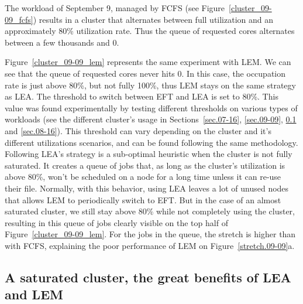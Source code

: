 \documentclass[conference,10pt]{IEEEtran}
\begin{document}
The workload of September 9, managed by FCFS (see Figure~\ref{cluster_09-09_fcfs})
results in a cluster that alternates between full utilization and an approximately 80\% utilization rate.
Thus the queue of requested cores alternates between a few thousands and 0.

Figure~\ref{cluster_09-09_lem} represents the same experiment with LEM.
We can see that the queue of requested cores never hits 0.
In this case, the occupation rate is just above 80\%, but not fully
100\%, thus LEM stays on the same strategy as LEA.
The threshold to switch between EFT and LEA is set to 80\%. 
This value was found experimentally by testing different thresholds on various types of workloads (see the different cluster's usage in Sections~\ref{sec.07-16}, \ref{sec.09-09}, \ref{sec.03-26} and \ref{sec.08-16}).
This threshold can vary depending on the cluster and it's different utilizations scenarios, and can be found following the same methodology.
Following LEA's strategy is a sub-optimal heuristic when the cluster is not fully saturated.
It creates a queue of jobs that, as long as the cluster's utilization is above 80\%, won't
be scheduled on a node for a long time unless it can re-use their file.
Normally, with this behavior, using LEA leaves a lot of unused nodes that allows LEM
to periodically switch to EFT. But in the case of an almost 
saturated cluster, we still stay above 80\% while not completely using the cluster,
resulting in this queue of jobs clearly visible on the top half of Figure~\ref{cluster_09-09_lem}.
For the jobs in the queue, the stretch is higher than with FCFS, explaining the poor performance of
LEM on Figure~\ref{stretch.09-09}a.

\subsection{A saturated cluster, the great benefits of LEA and LEM}\label{sec.03-26}
\end{document}
